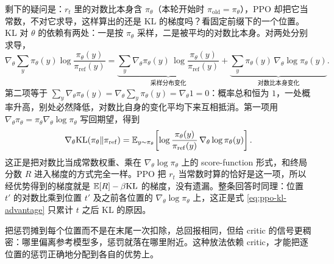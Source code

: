 剩下的疑问是：\(r_t\) 里的对数比本身含 \(\pi_\theta\)（本轮开始时 \(\pi_{\mathrm{old}}=\pi_\theta\)），PPO 却把它当常数，不对它求导，这样算出的还是 KL 的梯度吗？看固定前缀下的一个位置。KL 对 \(\theta\) 的依赖有两处：一是按 \(\pi_\theta\) 采样，二是被平均的对数比本身。对两处分别求导，
\begin{equation}
 \nabla_\theta\sum_{y}\pi_\theta(y)\log\frac{\pi_\theta(y)}{\pi_{\mathrm{ref}}(y)}
 =\underbrace{\sum_y\nabla_\theta\pi_\theta(y)\,\log\frac{\pi_\theta(y)}{\pi_{\mathrm{ref}}(y)}}_{\text{采样分布变化}}
 +\underbrace{\sum_y\pi_\theta(y)\,\nabla_\theta\log\pi_\theta(y)}_{\text{对数比本身变化}} .
 \label{eq:ppo-kl-grad-split}
\end{equation}
第二项等于 \(\sum_y\nabla_\theta\pi_\theta(y)=\nabla_\theta\sum_y\pi_\theta(y)=\nabla_\theta1=0\)：概率总和恒为 \(1\)，一处概率升高，别处必然降低，对数比自身的变化平均下来互相抵消。第一项用 \(\nabla_\theta\pi_\theta=\pi_\theta\nabla_\theta\log\pi_\theta\) 写回期望，得到
\begin{equation}
 \nabla_\theta\mathrm{KL}(\pi_\theta\Vert\pi_{\mathrm{ref}})
 =\mathbb{E}_{y\sim\pi_\theta}\!\left[\log\frac{\pi_\theta(y)}{\pi_{\mathrm{ref}}(y)}\,\nabla_\theta\log\pi_\theta(y)\right].
 \label{eq:kl-score-grad}
\end{equation}
这正是把对数比当成常数权重、乘在 \(\nabla_\theta\log\pi_\theta\) 上的 score-function 形式，和终局分数 \(R\) 进入梯度的方式完全一样。PPO 把 \(r_t\) 当常数时算的恰好是这一项，所以经优势得到的梯度就是 \(\mathbb{E}[R]-\beta\mathrm{KL}\) 的梯度，没有遗漏。整条回答时同理：位置 \(t'\) 的对数比乘到位置 \(t'\) 及之前各位置的 \(\nabla_\theta\log\pi_\theta\) 上，这正是式 \eqref{eq:ppo-kl-advantage} 只累计 \(t\) 之后 KL 的原因。

把惩罚摊到每个位置而不是在末尾一次扣除，总回报相同，但给 critic 的信号更稠密：哪里偏离参考模型多，惩罚就落在哪里附近。这种放法依赖 critic，才能把逐位置的惩罚正确地分配到各自的优势上。

